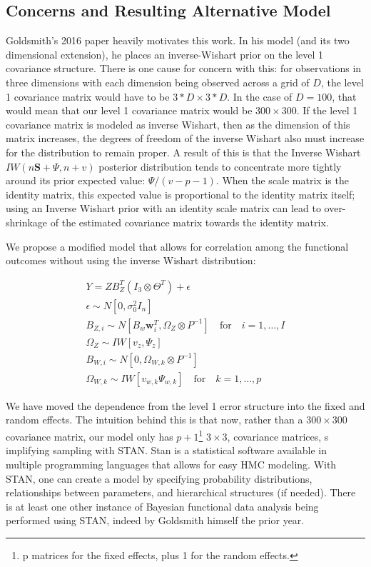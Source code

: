 \subsection{Concerns and Resulting Alternative Model}
Goldsmith's 2016 paper heavily motivates this work.  In his model (and its two dimensional extension), 
he places an inverse-Wishart prior on the level 1 covariance structure.  There is one cause for concern with this: 
for observations in three dimensions with each dimension being observed across a grid of \(D\), the level 1 covariance matrix 
would have to be \(3*D\times 3*D\).  In the case of \(D=100\), that would mean that our level 1 covariance matrix would be 
\(300\times300\).  If the level 1 covariance matrix is modeled as inverse Wishart, then as the dimension of this matrix increases, 
the degrees of freedom of the inverse Wishart also must increase for the distribution to remain proper. 
A result of this is that the Inverse Wishart \(IW\left(n\boldsymbol{S} + \Psi, n + v\right)\) posterior distribution tends to 
concentrate more tightly around its prior expected value: \(\Psi/{\left(v-p-1\right)}\)\cite{zhang_note_2021}. When the scale matrix is 
the identity matrix, this expected value is proportional to the identity matrix itself; using an Inverse Wishart prior with an identity 
scale matrix can lead to over-shrinkage of the estimated covariance matrix towards the identity matrix.

We propose a modified model that allows for correlation among the functional outcomes without using the inverse Wishart distribution: 

\begin{equation}
    \begin{split}
    Y = ZB_Z^T\left(I_3 \otimes\Theta^T\right) + \epsilon\\
    \epsilon\sim N[0, \sigma_{0}^2 I_n]\\
    B_{Z,i} \sim N[B_w \boldsymbol{w}_i^T, \Omega_Z\otimes P^{-1}]\quad \text{for} \quad i = 1,\dots, I\\
    \Omega_Z \sim IW [v_z, \Psi_z]\\
    B_{W,i} \sim N[0, \Omega_{W,k}\otimes P^{-1}]\\
    \Omega_{W,k} \sim IW[v_{w,k}\Psi_{w,k}]\quad\text{for} \quad k = 1,\dots, p
    \end{split}
    \label{model_centered_iid}
\end{equation}

We have moved the dependence from the level 1 error structure into the fixed and random effects.  
The intuition behind this is that now, rather than a \(300\times 300\) covariance matrix, our model only has 
\(p+1\)\footnote{p matrices for the fixed effects, plus 1 for the random effects.} \(3\times 3\), covariance matrices, s
implifying sampling with STAN.  Stan is a statistical software available in multiple programming languages that allows for easy
 HMC modeling.  With STAN, one can create a model by specifying probability distributions, relationships between parameters, and 
 hierarchical structures (if needed).  There is at least one other instance of Bayesian functional data analysis being performed 
 using STAN, indeed by Goldsmith himself the prior year\cite{goldsmith_generalized_2015}.

